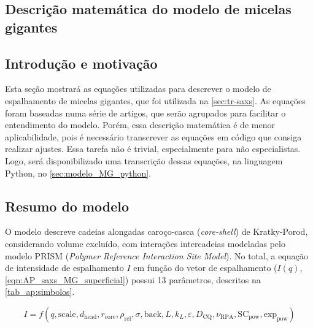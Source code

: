 \begin{apendicesenv}
\partapendices

\chapter{Descrição matemática do modelo de micelas gigantes}
\label{sec:modelo_MG_matematica}
\section{Introdução e motivação}

Esta seção mostrará as equações utilizadas para descrever o modelo de espalhamento de micelas gigantes, que foi utilizada na \autoref{sec:tr-saxs}. As equações foram baseadas numa série de artigos\cite{Pedersen1996, Yoshizaki1980, Cannavacciuolo2002, Pedersen2007a, Arleth2002}, que serão agrupados para facilitar o entendimento do modelo. Porém, essa descrição matemática é de menor aplicabilidade, pois é necessário transcrever as equações em código que consiga realizar ajustes. Essa tarefa não é trivial, especialmente para não especialistas. Logo, será disponibilizado uma transcrição dessas equações, na linguagem Python, no \autoref{sec:modelo_MG_python}.

\section{Resumo do modelo}  

O modelo descreve cadeias alongadas caroço-casca (\emph{core-shell}) de Kratky-Porod, considerando volume excluído, com interações intercadeias modeladas pelo modelo PRISM (\emph{Polymer Reference Interaction Site Model}). No total, a equação de intensidade de espalhamento \(I\) em função do vetor de espalhamento \q (\(I(q)\), \autoref{eqn:AP_saxs_MG_superficial}) possui 13 parâmetros, descritos na \autoref{tab_ap:simbolos}.

\begin{equation}
I = f(q, \mathrm{scale}, d_{\mathrm{head}}, r_{\mathrm{core}}, \rho_{\mathrm{rel}}, \sigma, \mathrm{back}, L, k_L, \varepsilon, D_{\mathrm{CQ}}, \nu_{\mathrm{RPA}}, \mathrm{SC}_{\mathrm{pow}}, \mathrm{exp}_{\mathrm{pow}})
\label{eqn:AP_saxs_MG_superficial}
\end{equation}


\end{apendicesenv}
